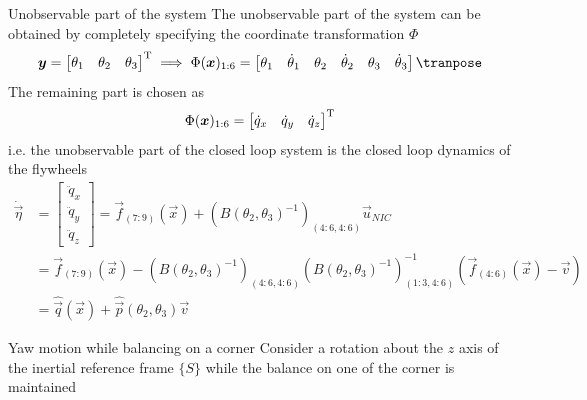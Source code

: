 \begin{frame}[shrink=10]{Unobservable part of the system}
  The unobservable part of the system can be obtained by completely specifying
  the coordinate transformation $\Phi$
  \[
  \vec{y} =
  \begin{bmatrix}
    \theta_1 &
    \theta_2 &
    \theta_3
  \end{bmatrix}\transpose
  \implies
  \Phi(\vec{x})_{1:6} =
  \begin{bmatrix}
    \theta_1 & \dot{\theta}_1 &  \theta_2 & \dot{\theta}_2 &
    \theta_3 & \dot{\theta}_3
  \end{bmatrix}\tranpose
  \]
  The remaining part is chosen as
  \[
  \Phi(\boldsymbol{x})_{1:6} =
  \begin{bmatrix}
    \dot{q}_x & \dot{q}_y & \dot{q}_z
  \end{bmatrix}^{\mathrm{T}}
  \]
  i.e. the unobservable part of the closed loop system is the closed loop dynamics of the
  flywheels
  \[
  \begin{split}
    \dot{\vec{\eta}} &=
    \begin{bmatrix}
      \ddot{q}_{x}\\
      \ddot{q}_{y}\\
      \ddot{q}_{z}
    \end{bmatrix}
    = \vec{f}_{(7:9)}(\vec{x}) + \left(B(\theta_2,\theta_3) ^ {-1}\right)_{(4:6, 4:6)} \vec{u}_{NIC}\\
    &=\vec{f}_{(7:9)}(\vec{x}) - \left(B(\theta_2,\theta_3) ^ {-1}\right)_{(4:6, 4:6)}
    \left(B(\theta_2,\theta_3) ^ {-1}\right)_{(1:3, 4:6)}^{-1}
    (\vec{f}_{(4:6)}(\vec{x}) - \vec{v})\\
    &=\hat{\vec{q}}(\vec{x}) + \hat{\vec{p}}(\theta_{2},\theta_{3})\vec{v}
  \end{split}
  \]
\end{frame}

\begin{frame}{Yaw motion while balancing on a corner}
  Consider a rotation about the $z$ axis of the inertial
  reference frame $\{S\}$ while the balance on one of the corner is maintained
  \begin{center}
  \end{center}
\end{frame}

